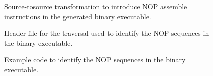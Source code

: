 \begin{figure}[!h]
{\indent
{\mySmallFontSize

\begin{latexonly}
   
\end{latexonly}

\begin{htmlonly}
   
\end{htmlonly}

}
}
\caption{Source-tosource transformation to introduce NOP assemble instructions in the
    generated binary executable.}
\label{Tutorial:exampleTransformSourceToInsertNOPs}
\end{figure}



\begin{figure}[!h]
{\indent
{\mySmallFontSize

\begin{latexonly}
   
\end{latexonly}

\begin{htmlonly}
   
\end{htmlonly}

}
}
\caption{Header file for the traversal used to identify the NOP sequences in the binary executable.}
\label{Tutorial:exampleTransformBinaryToDetectNOPs_header}
\end{figure}


\begin{figure}[!h]
{\indent
{\mySmallFontSize

\begin{latexonly}
   
\end{latexonly}

\begin{htmlonly}
   
\end{htmlonly}

}
}
\caption{Example code to identify the NOP sequences in the binary executable.}
\label{Tutorial:exampleTransformBinaryToDetectNOPs_source}
\end{figure}








